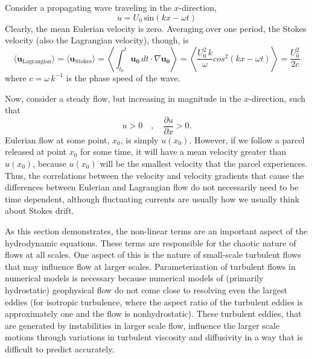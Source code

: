 \documentclass[11pt]{report}
\numberwithin{equation}{section}
\begin{document}
Consider a propagating wave traveling in the $x$-direction,
\begin{equation}
    u = U_0\,\mathrm{sin}(kx - \omega t)
\end{equation}
Clearly, the mean Eulerian velocity is zero.  Averaging over one period, the Stokes velocity (also the Lagrangian velocity), though, is
\begin{equation}
    \langle \mathbf{u_{\mathrm{Lagrangian}}} \rangle =
    \langle \mathbf{u_{\mathrm{Stokes}}} \rangle 
            = \left\langle \int_{t_0}^{t} \mathbf{u_0}\,dt\cdot\nabla\mathbf{u_0} \right\rangle 
            = \left\langle \frac{U_0^2\,k}{\omega} cos^2(kx - \omega t)  \right\rangle 
            = \frac{U_0^2}{2 c}
\end{equation}
where $c=\omega\,k^{-1}$ is the phase speed of the wave.

Now, consider a steady flow, but increasing in magnitude in the $x$-direction, such that
\begin{equation}
    u > 0\quad,\quad \frac{\partial u}{\partial x} > 0.
\end{equation}
Eulerian flow at some point, $x_0$, is simply $u(x_0)$.  However, if we follow a parcel released at point $x_0$ for some time, it will have a mean velocity greater than $u(x_0)$, because $u(x_0)$ will be the smallest velocity that the parcel experiences.  Thus, the correlations between the velocity and velocity gradients that cause the differences between Eulerian and Lagrangian flow do not necessarily need to be time dependent, although fluctuating currents are usually how we usually think about Stokes drift.

As this section demonstrates, the non-linear terms are an important aspect of the hydrodynamic equations.  These terms are responsible for the chaotic nature of flows at all scales.  One aspect of this is the nature of small-scale turbulent flows that may influence flow at larger scales.  Parameterization of turbulent flows in numerical models is necessary because numerical models of (primarily hydrostatic) geophysical flow do not come close to resolving even the largest eddies (for isotropic turbulence, where the aspect ratio of the turbulent eddies is approximately one and the flow is nonhydrostatic).  These turbulent eddies, that are generated by instabilities in larger scale flow, influence the larger scale motions through variations in turbulent viscosity and diffusivity in a way that is difficult to predict accurately.
\end{document}

